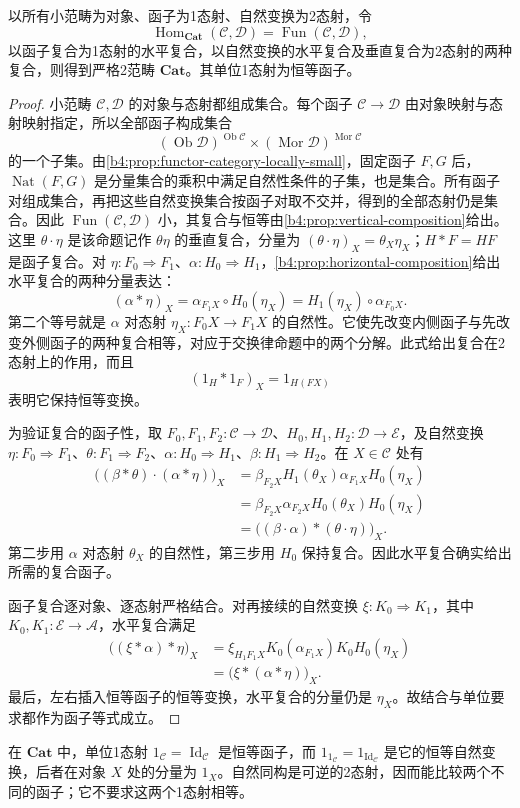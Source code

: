 \begin{proposition}\label{b4:prop:F-two-category-of-categories}
	以所有小范畴为对象、函子为1态射、自然变换为2态射，令
	\[
		\operatorname{Hom}_{\mathbf{Cat}}(\mathcal C,\mathcal D) =\operatorname{Fun}(\mathcal C,\mathcal D),
	\]
	以函子复合为1态射的水平复合，以自然变换的水平复合及垂直复合为2态射的两种复合，则得到严格2范畴 \(\mathbf{Cat}\)。其单位1态射为恒等函子。
\end{proposition}
\begin{proof}
	小范畴 \(\mathcal C,\mathcal D\) 的对象与态射都组成集合。每个函子 \(\mathcal C\rightarrow\mathcal D\) 由对象映射与态射映射指定，所以全部函子构成集合
	\[
		(\operatorname{Ob}\mathcal D)^{\operatorname{Ob}\mathcal C} \times(\operatorname{Mor}\mathcal D)^{\operatorname{Mor}\mathcal C}
	\]
	的一个子集。由\cref{b4:prop:functor-category-locally-small}，固定函子 \(F,G\) 后，\(\operatorname{Nat}(F,G)\) 是分量集合的乘积中满足自然性条件的子集，也是集合。所有函子对组成集合，再把这些自然变换集合按函子对取不交并，得到的全部态射仍是集合。因此 \(\operatorname{Fun}(\mathcal C,\mathcal D)\) 小，其复合与恒等由\cref{b4:prop:vertical-composition}给出。这里 \(\theta\cdot\eta\) 是该命题记作 \(\theta\eta\) 的垂直复合，分量为 \((\theta\cdot\eta)_X=\theta_X\eta_X\)；\(H*F=HF\) 是函子复合。对 \(\eta:F_0\Rightarrow F_1\)、\(\alpha:H_0\Rightarrow H_1\)，\cref{b4:prop:horizontal-composition}给出水平复合的两种分量表达：
	\[
		(\alpha*\eta)_X =\alpha_{F_1X}\circ H_0(\eta_X) =H_1(\eta_X)\circ\alpha_{F_0X}.
	\]
	第二个等号就是 \(\alpha\) 对态射 \(\eta_X:F_0X\rightarrow F_1X\) 的自然性。它使先改变内侧函子与先改变外侧函子的两种复合相等，对应于交换律命题中的两个分解。此式给出复合在2态射上的作用，而且
	\[
		(1_H*1_F)_X=1_{H(FX)}
	\]
	表明它保持恒等变换。

	为验证复合的函子性，取 \(F_0,F_1,F_2:\mathcal C\rightarrow\mathcal D\)、\(H_0,H_1,H_2:\mathcal D\rightarrow\mathcal E\)，及自然变换 \(\eta:F_0\Rightarrow F_1\)、\(\theta:F_1\Rightarrow F_2\)、\(\alpha:H_0\Rightarrow H_1\)、\(\beta:H_1\Rightarrow H_2\)。在 \(X\in\mathcal C\) 处有
	\[
		\begin{aligned}
			\bigl((\beta*\theta)\cdot(\alpha*\eta)\bigr)_X &=\beta_{F_2X}H_1(\theta_X)\alpha_{F_1X}H_0(\eta_X)\\
			&=\beta_{F_2X}\alpha_{F_2X}H_0(\theta_X)H_0(\eta_X)\\
			&=\bigl((\beta\cdot\alpha)*(\theta\cdot\eta)\bigr)_X.
		\end{aligned}
	\]
	第二步用 \(\alpha\) 对态射 \(\theta_X\) 的自然性，第三步用 \(H_0\) 保持复合。因此水平复合确实给出所需的复合函子。

	函子复合逐对象、逐态射严格结合。对再接续的自然变换 \(\xi:K_0\Rightarrow K_1\)，其中 \(K_0,K_1:\mathcal E\rightarrow\mathcal A\)，水平复合满足
	\[
		\begin{aligned}
			\bigl((\xi*\alpha)*\eta\bigr)_X &=\xi_{H_1F_1X}K_0(\alpha_{F_1X})K_0H_0(\eta_X)\\
			&=\bigl(\xi*(\alpha*\eta)\bigr)_X.
		\end{aligned}
	\]
	最后，左右插入恒等函子的恒等变换，水平复合的分量仍是 \(\eta_X\)。故结合与单位要求都作为函子等式成立。
\end{proof}

在 \(\mathbf{Cat}\) 中，单位1态射 \(1_{\mathcal C}=\operatorname{Id}_{\mathcal C}\) 是恒等函子，而 \(1_{1_{\mathcal C}}=1_{\operatorname{Id}_{\mathcal C}}\) 是它的恒等自然变换，后者在对象 \(X\) 处的分量为 \(1_X\)。自然同构是可逆的2态射，因而能比较两个不同的函子；它不要求这两个1态射相等。
